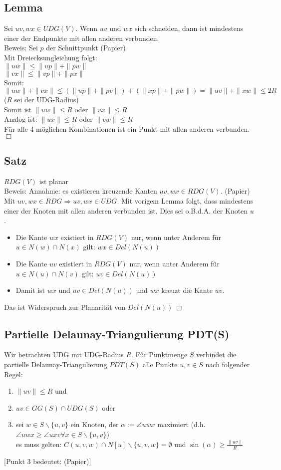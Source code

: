 \documentclass{article}
\begin{document}
\subsection*{Lemma}
Sei $uv, wx \in UDG(V)$. Wenn $uv$ und $wx$ sich schneiden, dann
ist mindestens einer der Endpunkte mit allen anderen verbunden. \\
Beweis: Sei $p$ der Schnittpunkt (Papier) \\
Mit Dreiecksungleichung folgt: \\
$\|uw\| \leq \|up\| + \|pw\|$ \\
$\|vx\| \leq \|vp\| + \|px\|$ \\
Somit: $\|uw\| + \|vx\| \leq (\|up\|+\|pv\|)+(\|xp\|+\|pw\|) =
\|uv\|+\|xw\| \leq 2R$ ($R$ sei der UDG-Radius) \\
Somit ist $\|uw\| \leq R$ oder $\|vx\| \leq R$ \\
Analog ist: $\|ux\| \leq R$ oder $\|vw\| \leq R$ \\
Für alle 4 möglichen Kombinationen ist ein Punkt mit allen anderen
verbunden. $\Box$ \\

\subsection*{Satz}
$RDG(V)$ ist planar \\
Beweis: Annahme: es existieren kreuzende Kanten $uv, wx \in RDG(V)$.
(Papier) Mit $uv,wx \in RDG \Rightarrow uv, wx \in UDG$. Mit vorigem
Lemma folgt, dass mindestens einer der Knoten mit allen anderen
verbunden ist. Dies sei o.B.d.A. der Knoten $u$.
\begin{itemize}
	\item Die Kante $wx$ existiert in $RDG(V)$ nur, wenn unter Anderem für
	$u \in N(w) \cap N(x)$ gilt: $wx \in Del(N(u))$
	\item Die Kante $uv$ existiert in $RDG(V)$ nur, wenn unter Anderem für
	$u \in N(u) \cap N(v)$ gilt: $uv \in Del(N(u))$
	\item Damit ist $wx$ und $uv \in Del(N(u))$ und $wx$ kreuzt die Kante $uv$.
\end{itemize}
Das ist Widerspruch zur Planarität von $Del(N(u)) \ \Box$ \\
\subsection*{Partielle Delaunay-Triangulierung PDT(S)}
Wir betrachten UDG mit UDG-Radius $R$. Für Punktmenge $S$ verbindet die
partielle Delaunay-Triangulierung $PDT(S)$ alle Punkte $u,v \in S$ nach
folgender Regel:
\begin{enumerate}
	\item $\|uv\| \leq R$ und
	\item $uv \in GG(S) \cap UDG(S)$ oder
	\item sei $w \in S \backslash \{u,v\}$ ein Knoten, der $\alpha := \angle
	uwx$ maximiert (d.h. $\angle uwx \geq \angle uxv \forall x \in S
	\backslash\{u,v\}$) \\ es muss gelten: $C(u,v,w) \cap
	N[u]\backslash\{u,v,w\} = \emptyset$ und $\displaystyle \sin(\alpha)
	\geq \frac{\|uv\|}{R}$
\end{enumerate}
[Punkt 3 bedeutet: (Papier)]
\end{document}
